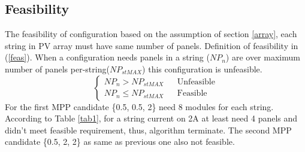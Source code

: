 \documentclass[conference]{IEEEtran}
\begin{document}
\subsection{Feasibility}
The feasibility of configuration based on the assumption of section \ref{array}, each string in PV array must have same number of panels. Definition of feasibility in (\ref{feas}). When a configuration needs panels in a string (\textit{$NP_n$}) are over maximum number of panels per-string(\textit{$NP_{stMAX}$}) this configuration is unfeasible. 
\begin{equation}
\left\{\begin{matrix}
NP_n > NP_{stMAX}& & \text{Unfeasible}\\ 
NP_n \leq NP_{stMAX} & & \text{Feasible} 
\label{feas}
\end{matrix}\right. 
\end{equation}
For the first MPP candidate \{0.5, 0.5, 2\} need 8 modules for each string. According to Table \ref{tab1}, for a string current on 2A at least need 4 panels and didn't meet feasible requirement, thus, algorithm terminate. The second MPP candidate \{0.5, 2, 2\} as same as previous one also not feasible.
\end{document}
